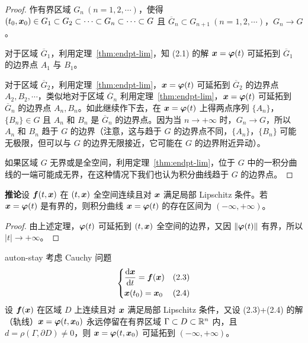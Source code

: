 \begin{proof}
作有界区域 $G_n\ (n = 1, 2, \cdots)$，使得 $(t_0, \boldsymbol{x}_0) \in G_1 \subset G_2 \subset \cdots \subset G_n \subset \cdots \subset G$ 且 $\overline{G}_n \subset G_{n+1}\ (n = 1, 2, \cdots)$，$G_n \to G$。

对于区域 $\overline{G}_1$，利用定理~\ref{thm:endpt-lim}，知 (2.1) 的解 $\boldsymbol{x} = \boldsymbol{\varphi}(t)$ 可延拓到 $\overline{G}_1$ 的边界点 $A_1$ 与 $B_1$。

对于区域 $\overline{G}_2$，利用定理~\ref{thm:endpt-lim}，$\boldsymbol{x} = \boldsymbol{\varphi}(t)$ 可延拓到 $\overline{G}_2$ 的边界点 $A_2, B_2, \cdots$，类似地对于区域 $\overline{G}_n$ 利用定理~\ref{thm:endpt-lim}，$\boldsymbol{x} = \boldsymbol{\varphi}(t)$ 可延拓到 $\overline{G}_n$ 的边界点 $A_n, B_n$。如此继续作下去，在 $\boldsymbol{x} = \boldsymbol{\varphi}(t)$ 上得两点序列 $\{A_n\}$，$\{B_n\} \in G$ 且 $A_n$ 和 $B_n$ 是 $\overline{G}_n$ 的边界点。因为当 $n \to +\infty$ 时，$G_n \to G$，所以 $A_n$ 和 $B_n$ 趋于 $G$ 的边界（注意，这与趋于 $G$ 的边界点不同，$\{A_n\}$，$\{B_n\}$ 可能无极限，但可以与 $G$ 的边界无限接近，它可能在 $G$ 的边界附近异动）。

如果区域 $G$ 无界或是全空间，利用定理~\ref{thm:endpt-lim}，位于 $G$ 中的一积分曲线的一端可能成无界，在这种情况下我们也认为积分曲线趋于 $G$ 的边界点。
\end{proof}

\par\medskip\noindent\textbf{推论}\quad 设 $\boldsymbol{f}(t, \boldsymbol{x})$ 在 $(t, \boldsymbol{x})$ 全空间连续且对 $\boldsymbol{x}$ 满足局部 Lipschitz 条件。若 $\boldsymbol{x} = \boldsymbol{\varphi}(t)$ 是有界的，则积分曲线 $\boldsymbol{x} = \boldsymbol{\varphi}(t)$ 的存在区间为 $(-\infty, +\infty)$。

\begin{proof}
由上述定理，$\boldsymbol{\varphi}(t)$ 可延拓到 $(t, \boldsymbol{x})$ 全空间的边界，又因 $\|\boldsymbol{\varphi}(t)\|$ 有界，所以 $|t| \to +\infty$。
\end{proof}

\begin{theorem}{}{auton-stay}
考虑 Cauchy 问题
\begin{equation*}
\left\{
\begin{aligned}
&\frac{\mathrm{d}\boldsymbol{x}}{\mathrm{d} t} = \boldsymbol{f}(\boldsymbol{x}) && \text{(2.3)}\\
&\boldsymbol{x}(t_0) = \boldsymbol{x}_0 && \text{(2.4)}
\end{aligned}
\right.
\end{equation*}
设 $\boldsymbol{f}(\boldsymbol{x})$ 在区域 $D$ 上连续且对 $\boldsymbol{x}$ 满足局部 Lipschitz 条件，又设 (2.3)+(2.4) 的解（轨线）$\boldsymbol{x} = \boldsymbol{\varphi}(t, \boldsymbol{x}_0)$ 永远停留在有界区域 $\Gamma \subset D \subset \mathbb{R}^n$ 内，且 $d = \rho(\Gamma, \partial D) \neq 0$，则 $\boldsymbol{x} = \boldsymbol{\varphi}(t, \boldsymbol{x}_0)$ 可延拓到 $(-\infty, +\infty)$。
\end{theorem}

